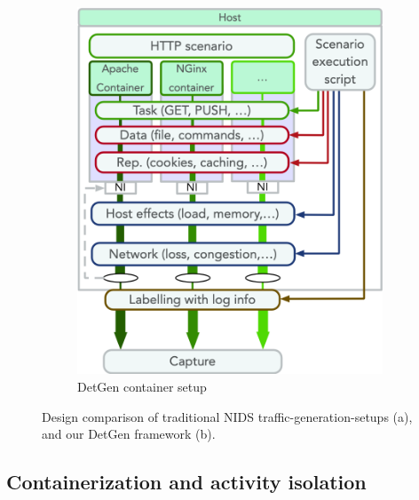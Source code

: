 \documentclass[runningheads]{llncs}
\begin{document}
\begin{figure}
\begin{subfigure}[b]{0.48\textwidth}
\includegraphics[width=\textwidth]{images/Docker_setup_final.png}
\vspace{0.0cm}
\vspace{-0.4cm}
\caption{DetGen container setup}
\end{subfigure}
\caption{Design comparison of traditional NIDS traffic-generation-setups (a), and our DetGen framework (b).}\label{Fig:Setup_comp}
\end{figure}

\subsection{Containerization and activity isolation}
\end{document}
